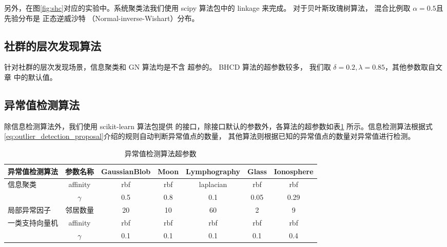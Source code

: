 另外，在图\ref{fig:shc}对应的实验中。系统聚类法我们使用 scipy 算法包中的 linkage 来完成。
对于贝叶斯玫瑰树算法，
混合比例取 $\alpha=0.5$且先验分布是
正态逆威沙特 （Normal-inverse-Wishart）分布。

\subsection{社群的层次发现算法}
针对社群的层次发现场景，信息聚类和 GN 算法均是不含
超参的。
BHCD 算法的超参数较多，
我们取 $\delta=0.2, \lambda=0.85$，其他参数取自文章\citet{RN23}
中的默认值。
\subsection{异常值检测算法}
除信息检测算法外，我们使用 scikit-learn 算法包提供
的接口，除接口默认的参数外，各算法的超参数如表\ref{tab:outlier_detection_alg_hyperparameter}
所示。信息检测算法根据式\ref{eq:outlier_detection_proposal}介绍的规则自动判断异常值点的数量，
其他算法则根据已知的异常值点的数量对异常值进行检测。

\begin{table}[!ht]
  \begin{adjustbox}{width=\columnwidth,center}
  \begin{tabular}{|l|c|c|c|c|c|c|}
  \hline
   异常值检测算法  &   参数名称 &
   GaussianBlob &  Moon &  Lymphography &   Glass &   Ionosphere \\
  \hline
   \multirow{2}{*}{信息聚类}  & affinity
   & rbf & rbf & laplacian
   & rbf & rbf \\
   \cline{2-7}
   & $\gamma$ & 0.5 & 0.8 & 0.1 & 0.05 & 0.29 \\
   \hline
   局部异常因子  &  
   邻居数量 & 20 &  10
   &  60
   & 2 &   9 \\
   \hline
   \multirow{2}{*}{一类支持向量机}  & 
   affinity & rbf &  rbf
   & rbf
   & rbf & rbf \\
   \cline{2-7}
   & $\gamma$ & 0.1 & 0.1 & 0.1 & 0.1 & 0.4\\
  \hline
  \end{tabular}
\end{adjustbox}
\caption{异常值检测算法超参数}\label{tab:outlier_detection_alg_hyperparameter}
\end{table}


